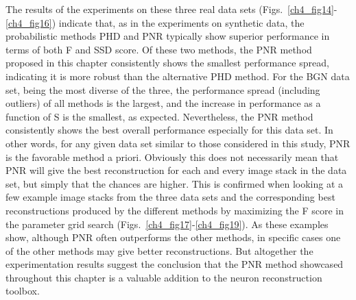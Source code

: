 The results of the experiments on these three real data sets (Figs.~\ref{ch4_fig14}-\ref{ch4_fig16}) indicate that, as in the experiments on synthetic data, the probabilistic methods PHD and PNR typically show superior performance in terms of both F and SSD score. Of these two methods, the PNR method proposed in this chapter consistently shows the smallest performance spread, indicating it is more robust than the alternative PHD method. For the BGN data set, being the most diverse of the three, the performance spread (including outliers) of all methods is the largest, and the increase in performance as a function of S is the smallest, as expected. Nevertheless, the PNR method consistently shows the best overall performance especially for this data set. In other words, for any given data set similar to those considered in this study, PNR is the favorable method a priori. Obviously this does not necessarily mean that PNR will give the best reconstruction for each and every image stack in the data set, but simply that the chances are higher. This is confirmed when looking at a few example image stacks from the three data sets and the corresponding best reconstructions produced by the different methods by maximizing the F score in the parameter grid search (Figs.~\ref{ch4_fig17}-\ref{ch4_fig19}). As these examples show, although PNR often outperforms the other methods, in specific cases one of the other methods may give better reconstructions. But altogether the experimentation results suggest the conclusion that the PNR method showcased throughout this chapter is a valuable addition to the neuron reconstruction toolbox.

